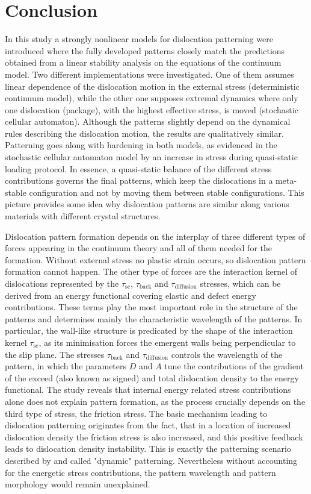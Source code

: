 \section{Conclusion} \label{sec:pattern_conclusion}
In this study a strongly nonlinear models for dislocation patterning were introduced where the fully developed patterns closely match the predictions obtained from a linear stability analysis on the equations of the continuum model. Two different implementations were investigated. One of them assumes linear dependence of the dislocation motion in the external stress (deterministic continuum model), while the other one supposes extremal dynamics where only one dislocation (package), with the highest effective stress, is moved (stochastic cellular automaton). Although the patterns slightly depend on the dynamical rules describing the dislocation motion, the results are qualitatively similar. Patterning goes along with hardening in both models, as evidenced in the stochastic cellular automaton model by an increase in stress during quasi-static loading protocol. In essence, a quasi-static balance of the different stress contributions governs the final patterns, which keep the dislocations in a meta-stable configuration and not by moving them between stable configurations. This picture provides some idea why dislocation patterns are similar along various materials with different crystal structures.

Dislocation pattern formation depends on the interplay of three different types of forces appearing in the continuum theory and all of them needed for the formation. Without external stress no plastic strain occurs, so dislocation pattern formation cannot happen. The other type of forces are the interaction kernel of dislocations represented by the ${\tau _{{\text{sc}}}}$, ${\tau _{{\text{back}}}}$ and ${\tau _{{\text{diffusion}}}}$ stresses, which can be derived from an energy functional covering elastic and defect energy contributions. These terms play the most important role in the structure of the patterns and determines mainly the characteristic wavelength of the patterns. In particular, the wall-like structure is predicated by the shape of the interaction kernel ${\tau _{\text{sc} }}$, as its minimisation forces the emergent walls being perpendicular to the slip plane. The stresses ${\tau _{{\text{back}}}}$ and ${\tau _{{\text{diffusion}}}}$ controls the wavelength of the pattern, in which the parameters $D$ and $A$ tune the contributions of the gradient of the exceed (also known as signed) and total dislocation density to the energy functional. The study reveals that internal energy related  stress contributions alone does not explain pattern formation, as the process crucially depends on the third type of stress, the friction stress. The basic mechanism leading to dislocation patterning originates from the fact, that in a location of increased dislocation density the friction stress is also increased, and this positive feedback leads to dislocation density instability. This is exactly the patterning scenario described by \citet{nabarro2000complementary} and called "dynamic" patterning. Nevertheless without accounting for the energetic stress contributions, the pattern wavelength and pattern morphology would remain unexplained.

